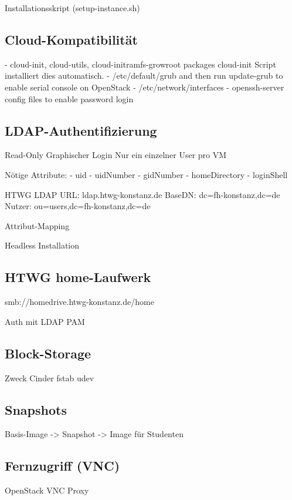 Installationsskript (setup-instance.sh)

\subsection{Cloud-Kompatibilität}

- cloud-init, cloud-utils, cloud-initramfs-growroot packages
cloud-init Script installiert dies automatisch.
- /etc/default/grub and then run update-grub to enable serial console on OpenStack
- /etc/network/interfaces
- openssh-server config files to enable password login

\subsection{LDAP-Authentifizierung}

Read-Only
Graphischer Login
Nur ein einzelner User pro VM

Nötige Attribute:
- uid
- uidNumber
- gidNumber
- homeDirectory
- loginShell

HTWG LDAP
URL: ldap.htwg-konstanz.de
BaseDN: dc=fh-konstanz,dc=de
Nutzer: ou=users,dc=fh-konstanz,dc=de

Attribut-Mapping

Headless Installation

\subsection{HTWG home-Laufwerk}

smb://homedrive.htwg-konstanz.de/home

Auth mit LDAP
PAM

\subsection{Block-Storage}

Zweck
Cinder
fstab
udev

\subsection{Snapshots}

Basis-Image -> Snapshot -> Image für Studenten


\subsection{Fernzugriff (VNC)}

OpenStack VNC Proxy

